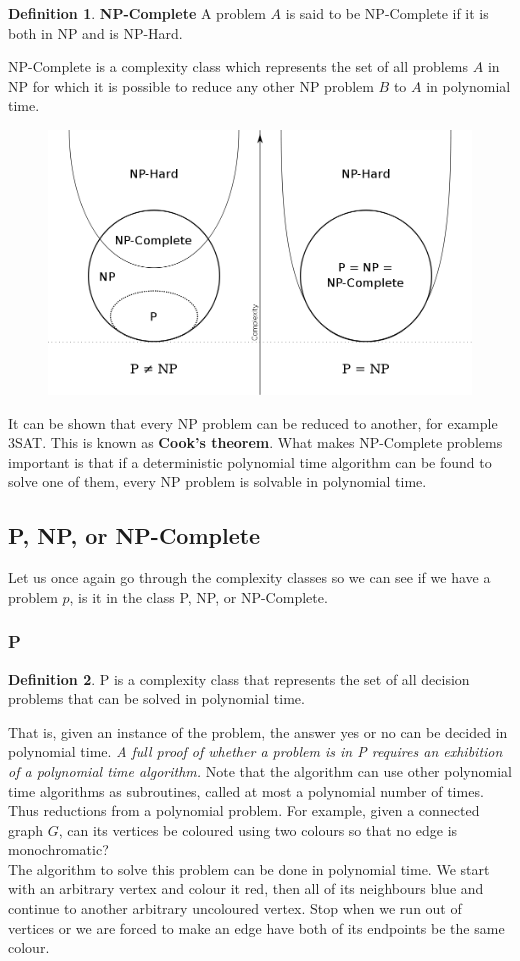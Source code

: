\documentclass{article}
\theoremstyle{definition}
\newtheorem{definition}{Definition}[section]
\newcommand{\n}[0]{\\[\baselineskip]}
\begin{document}
\begin{definition}{\textbf{NP-Complete}}
A problem $A$ is said to be NP-Complete if it is both in NP and is NP-Hard.
\end{definition}
\noindent
NP-Complete is a complexity class which represents the set of all problems $A$ in NP for which it is possible to reduce any other NP problem $B$ to $A$ in polynomial time. 
\begin{figure}[H]
\centering
\includegraphics[width=1\textwidth, keepaspectratio]{imgs/np-complete.png}
\end{figure}
\noindent
It can be shown that every NP problem can be reduced to another, for example 3SAT. This is known as \textbf{Cook's theorem}. What makes NP-Complete problems important is that if a deterministic polynomial time algorithm can be found to solve one of them, every NP problem is solvable in polynomial time. 
\subsection{P, NP, or NP-Complete}
Let us once again go through the complexity classes so we can see if we have a problem $p$, is it in the class P, NP, or NP-Complete.

\subsubsection{P}
\begin{definition}
P is a complexity class that represents the set of all decision problems that can be solved in polynomial time. 
\end{definition}
\noindent
That is, given an instance of the problem, the answer yes or no can be decided in polynomial time. \textit{A full proof of whether a problem is in P requires an exhibition of a polynomial time algorithm.} Note that the algorithm can use other polynomial time algorithms as subroutines, called at most a polynomial number of times. Thus reductions from a polynomial problem. For example, given a connected graph $G$, can its vertices be coloured using two colours so that no edge is monochromatic?
\n
The algorithm to solve this problem can be done in polynomial time. We start with an arbitrary vertex and colour it red, then all of its neighbours blue and continue to another arbitrary uncoloured vertex. Stop when we run out of vertices or we are forced to make an edge have both of its endpoints be the same colour.
\end{document}

